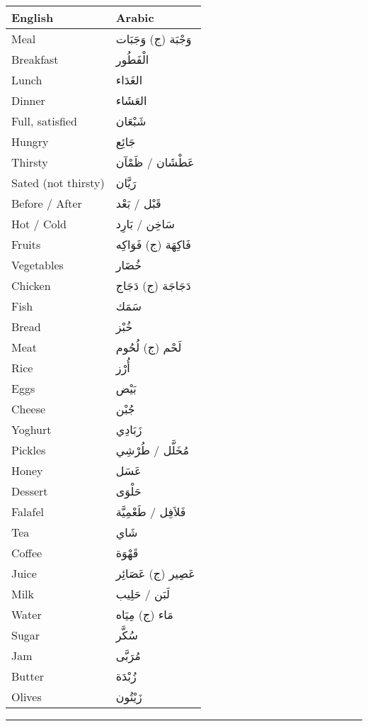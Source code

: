 \documentclass[
  a4paper,
  DIV=11,
  numbers=noendperiod]{scrartcl}
\begin{document}
\begin{longtable}[]{@{}ll@{}}
\toprule\noalign{}
English & Arabic \\
\midrule\noalign{}
\endhead
\bottomrule\noalign{}
\endlastfoot
Meal & وَجْبَة (ج) وَجَبَات \\
Breakfast & الْفَطُور \\
Lunch & الغَدَاء \\
Dinner & العَشَاء \\
Full, satisfied & شَبْعَان \\
Hungry & جَائِع \\
Thirsty & عَطْشَان / ظَمْآن \\
Sated (not thirsty) & رَيَّان \\
Before / After & قَبْل / بَعْد \\
Hot / Cold & سَاخِن / بَارِد \\
Fruits & فَاكِهَة (ج) فَوَاكِه \\
Vegetables & خُضَار \\
Chicken & دَجَاجَة (ج) دَجَاج \\
Fish & سَمَك \\
Bread & خُبْز \\
Meat & لَحْم (ج) لُحُوم \\
Rice & أُرْز \\
Eggs & بَيْض \\
Cheese & جُبْن \\
Yoghurt & زَبَادِي \\
Pickles & مُخَلَّل / طُرْشِي \\
Honey & عَسَل \\
Dessert & حَلْوَى \\
Falafel & فَلاَفِل / طَعْمِيَّة \\
Tea & شَاي \\
Coffee & قَهْوَة \\
Juice & عَصِير (ج) عَصَائِر \\
Milk & لَبَن / حَلِيب \\
Water & مَاء (ج) مِيَاه \\
Sugar & سُكَّر \\
Jam & مُرَبَّى \\
Butter & زُبْدَة \\
Olives & زَيْتُون \\
\end{longtable}

\begin{center}\rule{0.5\linewidth}{0.5pt}\end{center}
\end{document}
